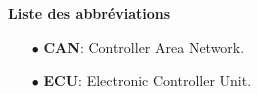 {\Huge \bf Liste des abbr\'eviations} \label{GLOSSAIRE}
\bigskip

\begin{itemize}
\item[$\bullet$] {\bf CAN}: Controller Area Network.
\item[$\bullet$] {\bf ECU}: Electronic Controller Unit.
\end{itemize}


